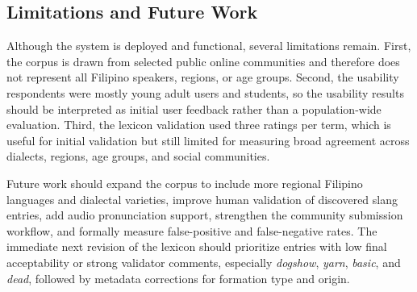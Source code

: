 \subsection{Limitations and Future Work}
Although the system is deployed and functional, several limitations remain. First, the corpus is drawn from selected public online communities and therefore does not represent all Filipino speakers, regions, or age groups. Second, the usability respondents were mostly young adult users and students, so the usability results should be interpreted as initial user feedback rather than a population-wide evaluation. Third, the lexicon validation used three ratings per term, which is useful for initial validation but still limited for measuring broad agreement across dialects, regions, age groups, and social communities.

Future work should expand the corpus to include more regional Filipino languages and dialectal varieties, improve human validation of discovered slang entries, add audio pronunciation support, strengthen the community submission workflow, and formally measure false-positive and false-negative rates. The immediate next revision of the lexicon should prioritize entries with low final acceptability or strong validator comments, especially \textit{dogshow}, \textit{yarn}, \textit{basic}, and \textit{dead}, followed by metadata corrections for formation type and origin.